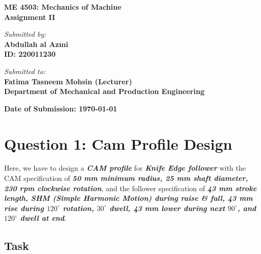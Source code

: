 \documentclass[12pt]{article}
\begin{document}
\begin{titlepage}
    \begin{center}
        \vspace*{2cm}
        {\Huge \textbf{ ME 4503: Mechanics of Machine}} \\
        \vspace{1cm}
        \Large{\textbf{Assignment II}} \\

        \vfill

        \textit{\large Submitted by:} \\
        \vspace{0.3cm}
        \textbf{Abdullah al Azmi} \\
        \textbf{ID: 220011230} \\

        \vfill

        \textit{\large Submitted to:} \\
        \vspace{0.3cm}
        \textbf{\Large Fatima Tasneem Mohsin (Lecturer)} \\
        \textbf{Department of Mechanical and Production Engineering} \\

        \vfill

        \textbf{Date of Submission: \today}
        \vspace*{1cm}
    \end{center}
\end{titlepage}

\newpage

\section{Question 1: Cam Profile Design}

Here, we have to design a \textit{\textbf{CAM profile}} for \textit\textbf{{Knife Edge follower}} with the CAM specification of \textit{\textbf{50 mm minimum radius, 25 mm shaft diameter, 230 rpm clockwise rotation}}, and the follower specification of \textit{\textbf{43 mm stroke length, SHM (Simple Harmonic Motion) during raise \& fall, 43 mm rise during $120^\circ$ rotation, $30^\circ$ dwell, 43 mm lower during next $90^\circ$, and $120^\circ$ dwell at end}}.

\subsection{Task}
\end{document}
